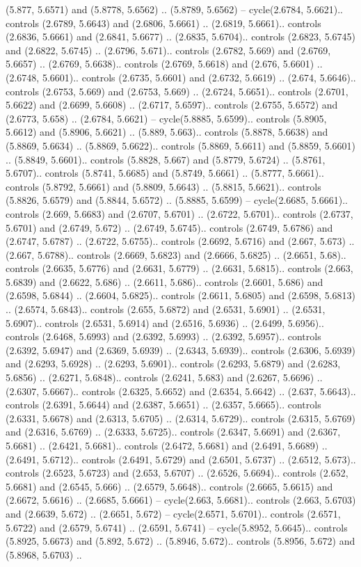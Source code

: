 (5.877, 5.6571) and (5.8778, 5.6562) .. (5.8789, 5.6562) -- cycle(2.6784, 5.6621).. controls (2.6789, 5.6643) and (2.6806, 5.6661) .. (2.6819, 5.6661).. controls (2.6836, 5.6661) and (2.6841, 5.6677) .. (2.6835, 5.6704).. controls (2.6823, 5.6745) and (2.6822, 5.6745) .. (2.6796, 5.671).. controls (2.6782, 5.669) and (2.6769, 5.6657) .. (2.6769, 5.6638).. controls (2.6769, 5.6618) and (2.676, 5.6601) .. (2.6748, 5.6601).. controls (2.6735, 5.6601) and (2.6732, 5.6619) .. (2.674, 5.6646).. controls (2.6753, 5.669) and (2.6753, 5.669) .. (2.6724, 5.6651).. controls (2.6701, 5.6622) and (2.6699, 5.6608) .. (2.6717, 5.6597).. controls (2.6755, 5.6572) and (2.6773, 5.658) .. (2.6784, 5.6621) -- cycle(5.8885, 5.6599).. controls (5.8905, 5.6612) and (5.8906, 5.6621) .. (5.889, 5.663).. controls (5.8878, 5.6638) and (5.8869, 5.6634) .. (5.8869, 5.6622).. controls (5.8869, 5.6611) and (5.8859, 5.6601) .. (5.8849, 5.6601).. controls (5.8828, 5.667) and (5.8779, 5.6724) .. (5.8761, 5.6707).. controls (5.8741, 5.6685) and (5.8749, 5.6661) .. (5.8777, 5.6661).. controls (5.8792, 5.6661) and (5.8809, 5.6643) .. (5.8815, 5.6621).. controls (5.8826, 5.6579) and (5.8844, 5.6572) .. (5.8885, 5.6599) -- cycle(2.6685, 5.6661).. controls (2.669, 5.6683) and (2.6707, 5.6701) .. (2.6722, 5.6701).. controls (2.6737, 5.6701) and (2.6749, 5.672) .. (2.6749, 5.6745).. controls (2.6749, 5.6786) and (2.6747, 5.6787) .. (2.6722, 5.6755).. controls (2.6692, 5.6716) and (2.667, 5.673) .. (2.667, 5.6788).. controls (2.6669, 5.6823) and (2.6666, 5.6825) .. (2.6651, 5.68).. controls (2.6635, 5.6776) and (2.6631, 5.6779) .. (2.6631, 5.6815).. controls (2.663, 5.6839) and (2.6622, 5.686) .. (2.6611, 5.686).. controls (2.6601, 5.686) and (2.6598, 5.6844) .. (2.6604, 5.6825).. controls (2.6611, 5.6805) and (2.6598, 5.6813) .. (2.6574, 5.6843).. controls (2.655, 5.6872) and (2.6531, 5.6901) .. (2.6531, 5.6907).. controls (2.6531, 5.6914) and (2.6516, 5.6936) .. (2.6499, 5.6956).. controls (2.6468, 5.6993) and (2.6392, 5.6993) .. (2.6392, 5.6957).. controls (2.6392, 5.6947) and (2.6369, 5.6939) .. (2.6343, 5.6939).. controls (2.6306, 5.6939) and (2.6293, 5.6928) .. (2.6293, 5.6901).. controls (2.6293, 5.6879) and (2.6283, 5.6856) .. (2.6271, 5.6848).. controls (2.6241, 5.683) and (2.6267, 5.6696) .. (2.6307, 5.6667).. controls (2.6325, 5.6652) and (2.6354, 5.6642) .. (2.637, 5.6643).. controls (2.6391, 5.6644) and (2.6387, 5.6651) .. (2.6357, 5.6665).. controls (2.6331, 5.6678) and (2.6313, 5.6705) .. (2.6314, 5.6729).. controls (2.6315, 5.6769) and (2.6316, 5.6769) .. (2.6333, 5.6725).. controls (2.6347, 5.6691) and (2.6367, 5.6681) .. (2.6421, 5.6681).. controls (2.6472, 5.6681) and (2.6491, 5.6689) .. (2.6491, 5.6712).. controls (2.6491, 5.6729) and (2.6501, 5.6737) .. (2.6512, 5.673).. controls (2.6523, 5.6723) and (2.653, 5.6707) .. (2.6526, 5.6694).. controls (2.652, 5.6681) and (2.6545, 5.666) .. (2.6579, 5.6648).. controls (2.6665, 5.6615) and (2.6672, 5.6616) .. (2.6685, 5.6661) -- cycle(2.663, 5.6681).. controls (2.663, 5.6703) and (2.6639, 5.672) .. (2.6651, 5.672) -- cycle(2.6571, 5.6701).. controls (2.6571, 5.6722) and (2.6579, 5.6741) .. (2.6591, 5.6741) -- cycle(5.8952, 5.6645).. controls (5.8925, 5.6673) and (5.892, 5.672) .. (5.8946, 5.672).. controls (5.8956, 5.672) and (5.8968, 5.6703) .. 